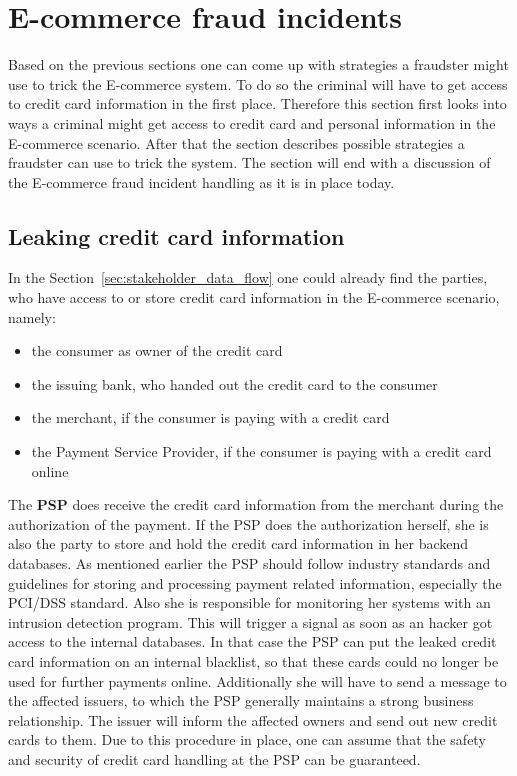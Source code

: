 
\section{E-commerce fraud incidents}
\label{sec:scenario_fraud}

Based on the previous sections one can come up with strategies a fraudster might use to trick the E-commerce system. To do so the criminal will have to get access to credit card information in the first place. Therefore this section first looks into ways a criminal might get access to credit card and personal information in the E-commerce scenario. After that the section describes possible strategies a fraudster can use to trick the system. The section will end with a discussion of the E-commerce fraud incident handling as it is in place today.

\subsection{Leaking credit card information}
\label{subsec:leaking_credit_cards}

 In the Section~\ref{sec:stakeholder_data_flow} one could already find the parties, who have access to or store credit card information in the E-commerce scenario, namely:\@

\begin{itemize}
  \item the consumer as owner of the credit card
  \item the issuing bank, who handed out the credit card to the consumer
  \item the merchant, if the consumer is paying with a credit card
  \item the Payment Service Provider, if the consumer is paying with a credit card online
\end{itemize}

The \textbf{\gls{PSP}} does receive the credit card information from the merchant during the authorization of the payment. If the \gls{PSP} does the authorization herself, she is also the party to store and hold the credit card information in her backend databases. As mentioned earlier the \gls{PSP} should follow industry standards and guidelines for storing and processing payment related information, especially the PCI/DSS standard. Also she is responsible for monitoring her systems with an intrusion detection program. This will trigger a signal as soon as an hacker got access to the internal databases. In that case the \gls{PSP} can put the leaked credit card information on an internal blacklist, so that these cards could no longer be used for further payments online. Additionally she will have to send a message to the affected issuers, to which the \gls{PSP} generally maintains a strong business relationship. The issuer will inform the affected owners and send out new credit cards to them. Due to this procedure in place, one can assume that the safety and security of credit card handling at the \gls{PSP} can be guaranteed. \\


